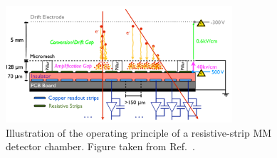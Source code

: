 \begin{figure}[!htb]
    \begin{center}
        \includegraphics[width=0.75\textwidth]{figures/nsw/nsw_mm_principle}
        \caption{
            Illustration of the operating principle of a resistive-strip MM detector chamber.
            Figure taken from Ref.~\cite{NSWTDR}.
        }
        \label{fig:nsw_mm_principle}
    \end{center}
\end{figure}


